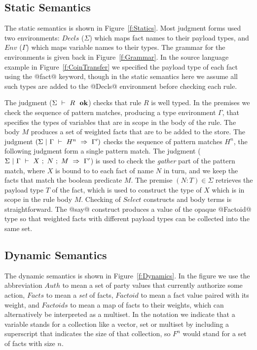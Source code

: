 \clearpage{}


\subsection{Static Semantics}
The static semantics is shown in Figure~\ref{f:Statics}. Most judgment forms used two environments: $Decls$ ($\Sigma$) which maps fact names to their payload types, and $Env$ ($\Gamma$) which maps variable names to their types. The grammar for the environments is given back in Figure~\ref{f:Grammar}. In the source language example in Figure~\ref{f:CoinTransfer} we specified the payload type of each fact using the @fact@ keyword, though in the static semantics here we assume all such types are added to the @Decls@ environment before checking each rule.

The judgment ($\Sigma ~\vdash~ R~~ \textbf{ok}$) checks that rule $R$ is well typed. In the premises we check the sequence of pattern matches, producing a type environment $\Gamma$, that specifies the types of variables that are in scope in the body of the rule. The body $M$ produces a set of weighted facts that are to be added to the store. The judgment $(\Sigma~|~\Gamma~\vdash~H^n~\Rightarrow~\Gamma')$ checks the sequence of pattern matches $H^n$, the following judgment form a single pattern match. The judgment ($\Sigma~|~\Gamma~\vdash~X ~;~ N ~;~ M~\Rightarrow~\Gamma'$) is used to check the \emph{gather} part of the pattern match, where $X$ is bound to to each fact of name $N$ in turn, and we keep the facts that match the boolean predicate $M$. The premise $(N:T) \in \Sigma$ retrieves the payload type $T$ of the fact, which is used to construct the type of $X$ which is in scope in the rule body $M$. Checking of $Select$ constructs and body terms is straightforward. The @say@ construct produces a value of the opaque @Factoid@ type so that weighted facts with different payload types can be collected into the same set.


\subsection{Dynamic Semantics}
The dynamic semantics is shown in Figure~\ref{f:Dynamics}. In the figure we use the abbreviation $Auth$ to mean a set of party values that currently authorize some action, $Facts$ to mean a \emph{set} of facts, $Factoid$ to mean a fact value paired with its weight, and $Factoids$ to mean a map of facts to their weights, which can alternatively be interpreted as a multiset. In the notation we indicate that a variable stands for a collection like a vector, set or multiset by including a superscript that indicates the size of that collection, so $F^n$ would stand for a set of facts with size $n$.

